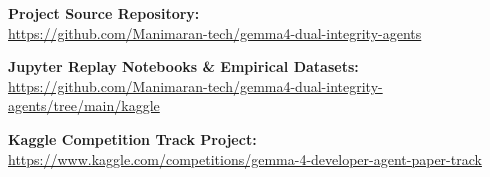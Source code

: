 \documentclass[10pt,twocolumn]{article}
\begin{document}
\noindent\textbf{Project Source Repository:}\\
\url{https://github.com/Manimaran-tech/gemma4-dual-integrity-agents}

\noindent\textbf{Jupyter Replay Notebooks \& Empirical Datasets:}\\
\url{https://github.com/Manimaran-tech/gemma4-dual-integrity-agents/tree/main/kaggle}

\noindent\textbf{Kaggle Competition Track Project:}\\
\url{https://www.kaggle.com/competitions/gemma-4-developer-agent-paper-track}



\end{document}

